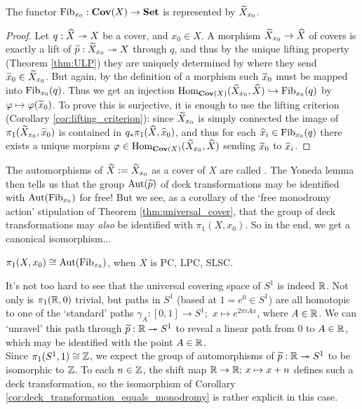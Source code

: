 \begin{cor}
	\label{cor:representability_of_Fib}
	The functor $\mathrm{Fib}_{x_0} : \mathbf{Cov}(X) \to \mathbf{Set}$ is represented by $\widetilde{X}_{x_0}$.
\end{cor}
\begin{proof}
	Let $q:\widehat{X} \twoheadrightarrow X$ be a cover, and $x_0 \in X$. A morphism $\widetilde{X}_{x_0} \to \widehat{X}$ of covers is exactly a lift of $\widetilde{p} : \widetilde{X}_{x_0} \twoheadrightarrow X$ through $q$, and thus by the unique lifting property (Theorem \ref{thm:ULP}) they are uniquely determined by where they send $\widetilde{x}_0 \in \widetilde{X}_{x_0}$. But again, by the definition of a morphism such $\widetilde{x}_0$ must be mapped into $\mathrm{Fib}_{x_0}(q)$. Thus we get an injection $\mathrm{Hom}_{\mathbf{Cov}(X)}(\widetilde{X}_{x_0}, \widehat{X}) \hookrightarrow \mathrm{Fib}_{x_0}(q)$ by $\varphi \mapsto \varphi(\widetilde{x}_0)$. To prove this is surjective, it is enough to use the lifting criterion (Corollary \ref{cor:lifting_criterion}): since $\widetilde{X}_{x_0}$ is simply connected the image of $\pi_1(\widetilde{X}_{x_0}, \widetilde{x}_0)$ is contained in $q_*\pi_1(\widehat{X}, \widehat{x}_0)$, and thus for each $\widehat{x}_i \in \mathrm{Fib}_{x_0}(q)$ there exists a unique morpism $\varphi \in \mathrm{Hom}_{\mathbf{Cov}(X)}(\widetilde{X}_{x_0}, \widehat{X})$ sending $\widetilde{x}_0$ to $\widehat{x}_i$.
\end{proof}

The automorphisms of $\widetilde{X} := \widetilde{X}_{x_0}$ as a cover of $X$ are called . The Yoneda lemma then tells us that the group $\mathrm{Aut}(\widetilde{p})$ of deck transformations may be identified with $\mathrm{Aut}(\mathrm{Fib}_{x_0})$ for free! But we see, as a corollary of the `free monodromy action' stipulation of Theorem \ref{thm:universal_cover}, that the group of deck transformations may \emph{also} be identified with $\pi_1(X,x_0)$. So in the end, we get a canonical isomorphism...

\begin{cor}
	\label{cor:deck_transformation_equals_monodromy}
	$\pi_1(X, x_0) \cong \mathrm{Aut}(\mathrm{Fib}_{x_0})$, when $X$ is PC, LPC, SLSC.
\end{cor}


\begin{eg}
	It's not too hard to see that the universal covering space of $S^1$ is indeed $\mathbb{R}$. Not only is $\pi_1(\mathbb{R}, 0)$ trivial, but paths in $S^1$ (based at $1 = e^0 \in S^1$) are all homotopic to one of the `standard' paths $\gamma_A : [0,1] \to S^1;\,\, x \mapsto e^{2 \pi i A x}$, where $A \in \mathbb{R}$. We can `unravel' this path through $\widetilde{p} : \mathbb{R} \twoheadrightarrow S^1$ to reveal a linear path from $0$ to $A \in \mathbb{R}$, which may be identified with the point $A \in \mathbb{R}$.\\

	Since $\pi_1(S^1, 1) \cong \mathbb{Z}$, we expect the group of automorphisms of $\widetilde{p}: \mathbb{R} \twoheadrightarrow S^1$ to be isomorphic to $\mathbb{Z}$. To each $n \in \mathbb{Z}$, the shift map $\mathbb{R} \to \mathbb{R};\, x \mapsto x+n$ defines such a deck transformation, so the isomorphism of Corollary \ref{cor:deck_transformation_equals_monodromy} is rather explicit in this case.
\end{eg}


